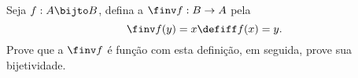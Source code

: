 \begin{exercise}
%
Seja $f : A \bijto B$, defina a  $\finv f : B \to A$ pela
$$
\finv f (y) = x \defiff f(x) = y.
$$
Prove que a $\finv f$ é função com esta definição, em seguida, prove sua bijetividade.
\end{exercise}


